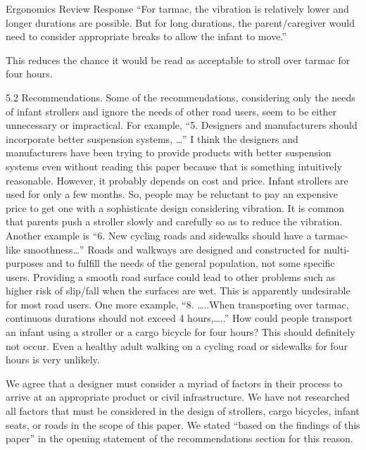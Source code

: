 \documentclass[a4paper]{letter}
\begin{document}
\begin{letter}{Ergonomics Review Response}
``For tarmac, the vibration is relatively lower and longer durations are
possible. But for long durations, the parent/caregiver would need to consider
appropriate breaks to allow the infant to move.''

This reduces the chance it would be read as acceptable to stroll over tarmac for
four hours.

\begin{displayquote}
    5.2 Recommendations. Some of the recommendations, considering only the needs
    of infant strollers and ignore the needs of other road users, seem to be
    either unnecessary or impractical.
    For example, ``5. Designers and manufacturers should incorporate better
    suspension systems, …'' I think the designers and manufacturers have been
    trying to provide products with better suspension systems even without
    reading this paper because that is something intuitively reasonable.
    However, it probably depends on cost and price. Infant strollers are used
    for only a few months. So, people may be reluctant to pay an expensive price
    to get one with a sophisticate design considering vibration. It is common
    that parents push a stroller slowly and carefully so as to reduce the
    vibration.
    Another example is ``6. New cycling roads and sidewalks should have a
    tarmac-like smoothness…'' Roads and walkways are designed and constructed
    for multi-purposes and to fulfill the needs of the general population, not
    some specific users. Providing a smooth road surface could lead to other
    problems such as higher risk of slip/fall when the surfaces are wet. This is
    apparently undesirable for most road users.
    One more example, ``8. …..When transporting over tarmac, continuous
    durations should not exceed 4 hours,…..'' How could people transport an
    infant using a stroller or a cargo bicycle for four hours? This should
    definitely not occur. Even a healthy adult walking on a cycling road or
    sidewalks for four hours is very unlikely.
\end{displayquote}

We agree that a designer must consider a myriad of factors in their process to
arrive at an appropriate product or civil infrastructure. We have not researched
all factors that must be considered in the design of strollers, cargo bicycles,
infant seats, or roads in the scope of this paper. We stated ``based on the
findings of this paper'' in the opening statement of the recommendations section
for this reason.


\end{letter}
\end{document}
